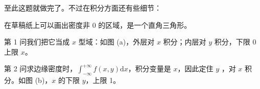 \documentclass[UTF8]{ctexart}
\renewcommand\d{\mathrm{d}}
\begin{document}
\newpage
{}
\BgThispage

至此这题就做完了。不过在积分方面还有些细节：

在草稿纸上可以画出密度非 0 的区域，是一个直角三角形。

第 1 问我们把它当成 $x$ 型域：如图 (a)，外层对 $x$ 积分；内层对 $y$ 积分，下限 0 上限 $x$。

第 2 问求边缘密度时，$\displaystyle\int_{-\infty}^{+\infty} f(x,y)\d x$，积分变量是 $x$，因此定住 $y$ ，对 $x$ 积分。如图 (b)，$x$ 的下限 $y$，上限 1。
\end{document}
